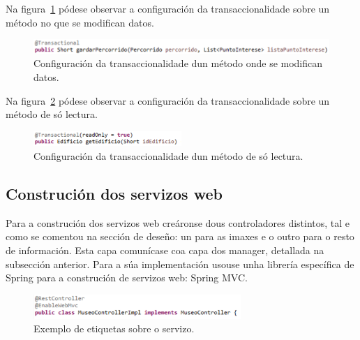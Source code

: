 Na figura~\ref{fig:metodoTransaccional} pódese observar a configuración da transaccionalidade sobre un método no que se modifican datos.

\begin{figure}[tbh] 
	\begin{center}
		\includegraphics[width=1\textwidth]{figures/codigo/metodoTransaccional}
		\caption{Configuración da transaccionalidade dun método onde se modifican datos.}
		\label{fig:metodoTransaccional}
	\end{center}
\end{figure}

Na figura~\ref{fig:metodoNonTransaccional} pódese observar a configuración da transaccionalidade sobre un método de só lectura.

\begin{figure}[tbh] 
	\begin{center}
		\includegraphics[width=0.5\textwidth]{figures/codigo/metodoNonTransaccional}
		\caption{Configuración da transaccionalidade dun método de só lectura.}
		\label{fig:metodoNonTransaccional}
	\end{center}
\end{figure}


\subsection{Construción dos servizos web}
Para a construción dos servizos web creáronse dous controladores distintos, tal e como se comentou na sección de deseño: un para as imaxes e o outro para o resto de información. Esta capa comunícase coa capa dos manager, detallada na subsección anterior. Para a súa implementación usouse unha librería específica de Spring para a construción de servizos web: Spring MVC.

\begin{figure}[tbh] 
	\begin{center}
		\includegraphics[width=0.7\textwidth]{figures/codigo/controladorMuseo}
		\caption{Exemplo de etiquetas sobre o servizo.}
		\label{fig:controladorMuseo}
	\end{center}
\end{figure}


